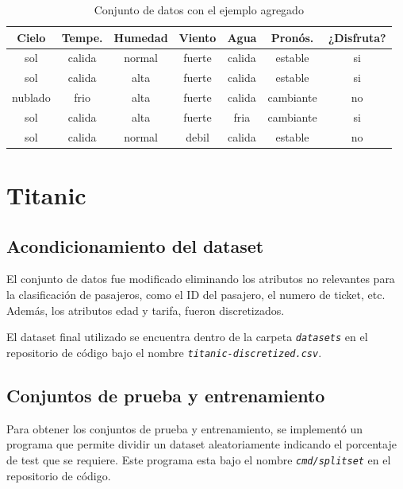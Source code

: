 \documentclass[a4paper]{article}
\newcommand{\italic}[1]{\textit{\texttt{#1}}}
\begin{document}
\begin{table}[h]
  \centering
  \begin{tabular}{ccccccc}
  Cielo                          & Tempe. & Humedad & Viento                        & Agua   & Pronós.    & ¿Disfruta?                \\ \hline
  {\color[HTML]{009901} sol}     & calida & normal  & {\color[HTML]{009901} fuerte} & calida & estable   & {\color[HTML]{009901} si} \\
  {\color[HTML]{009901} sol}     & calida & alta    & \color[HTML]{009901} fuerte  & calida & estable   & {\color[HTML]{009901} si} \\
  {\color[HTML]{CB0000} nublado} & frio   & alta    & fuerte                        & calida & cambiante & {\color[HTML]{CB0000} no} \\
  {\color[HTML]{009901} sol}     & calida & alta    & \color[HTML]{009901} fuerte & fria   & cambiante & {\color[HTML]{009901} si} \\
  {\color[HTML]{009901} sol}     & calida & normal  & {\color[HTML]{CB0000} debil}  & calida & estable   & {\color[HTML]{CB0000} no}
  \end{tabular}
  \caption{Conjunto de datos con el ejemplo agregado}
  \label{tab:dataset-2}
  \end{table}

\newpage
\section{Titanic}

\subsection{Acondicionamiento del dataset}
El conjunto de datos fue modificado eliminando los atributos no relevantes para la clasificación de pasajeros, como el ID del pasajero, el numero de ticket, etc. Además, los atributos edad y tarifa, fueron discretizados.

El dataset final utilizado se encuentra dentro de la carpeta \italic{datasets} en el repositorio de código bajo el nombre \italic{titanic-discretized.csv}. 

\subsection{Conjuntos de prueba y entrenamiento}
Para obtener los conjuntos de prueba y entrenamiento, se implementó un programa que permite dividir un dataset aleatoriamente indicando el porcentaje de test que se requiere. Este programa esta bajo el nombre \italic{cmd/splitset} en el repositorio de código.
\end{document}

